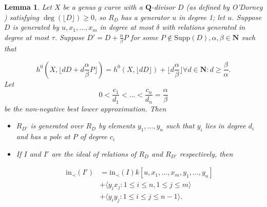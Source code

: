 \documentclass{amsart}
\theoremstyle{plain}
\newtheorem{lem}[thm]{Lemma}
\theoremstyle{definition}
\theoremstyle{remark}
\numberwithin{equation}{section}
\newcommand \Supp{\text{Supp}}
\newcommand \initial{\text{in}}
\begin{document}
\begin{lem}
\label{lem:deg1_sat_ind}
Let $X$ be a genus $g$ curve with a $\mathbf{Q}$-divisor $D$ (as
defined by O'Dorney )
satisfying $\deg(\lfloor{D}\rfloor)\ge 0$, so $R_D$ has a
generator $u$ in degree 1; let $u$.  Suppose $D$ is generated by $
u, x_1, \ldots, x_m$ in degree at most $\delta$ with relations generated 
in degree at most $\tau $.  Suppose $D' = D + \frac{\alpha}{\beta} P$
for some $P \not \in \Supp(D), \alpha,\beta \in \mathbf{N}$ such
that

\begin{equation}
\label{eqn:deg1_sat_ind_dim}
	h^0(X, \lfloor{dD + d\frac{\alpha}{\beta} P \rfloor}) = h^0(X,\lfloor dD
	\rfloor) + \lfloor d\frac{\alpha} {\beta} \rfloor \forall d \in \mathbf{
	N} : d \ge \frac{\beta}{\alpha}.
\end{equation}
Let 
\[
	0<\frac{c_1}{d_1}<...<\frac{c_n}{d_n}=\frac{\alpha}{\beta}
\]
be the non-negative best lower approximation.
Then 
\begin{itemize}
\item $R_{D'}$ is generated over $R_D$ by elements $y_1,...,y_n$ such that $y_i$ lies in  
degree $d_i$ and has a pole at $P$ of degree $c_i$
\item If $I$ and $I'$ are the ideal of relations of $R_D$ and $R_{D'}$ respectively, then 

\begin{align*}
	\initial_\prec(I') &= \initial_\prec(I) k[u, x_1, \ldots, x_m, y_1, \ldots, y_n] \\
										 &+ \langle y_i x_j: 1 \le i \le n, 1 \le j \le m \rangle \\
										 &+ \langle y_i y_j: 1 \le i \le j \le n-1 \rangle.
\end{align*}

\end{itemize}
\end{lem}
\end{document}
